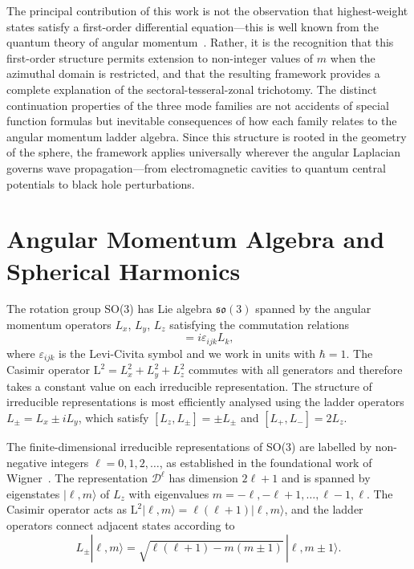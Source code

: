 \documentclass[
  aip,
  amsmath,amssymb,
  preprint
]{revtex4-1}
\begin{document}
The principal contribution of this work is not the observation that highest-weight states satisfy a first-order differential equation---this is well known from the quantum theory of angular momentum~\cite{Sakurai2017}. Rather, it is the recognition that this first-order structure permits extension to non-integer values of $m$ when the azimuthal domain is restricted, and that the resulting framework provides a complete explanation of the sectoral-tesseral-zonal trichotomy. The distinct continuation properties of the three mode families are not accidents of special function formulas but inevitable consequences of how each family relates to the angular momentum ladder algebra. Since this structure is rooted in the geometry of the sphere, the framework applies universally wherever the angular Laplacian governs wave propagation---from electromagnetic cavities to quantum central potentials to black hole perturbations.

\section{Angular Momentum Algebra and Spherical Harmonics}

The rotation group SO(3) has Lie algebra $\mathfrak{so}(3)$ spanned by the angular momentum operators $L_x$, $L_y$, $L_z$ satisfying the commutation relations
\begin{equation}
[L_i, L_j] = i\varepsilon_{ijk} L_k,
\label{eq:commutation}
\end{equation}
where $\varepsilon_{ijk}$ is the Levi-Civita symbol and we work in units with $\hbar = 1$. The Casimir operator $\mathrm{L}^2 = L_x^2 + L_y^2 + L_z^2$ commutes with all generators and therefore takes a constant value on each irreducible representation. The structure of irreducible representations is most efficiently analysed using the ladder operators $L_\pm = L_x \pm i L_y$, which satisfy $[L_z, L_\pm] = \pm L_\pm$ and $[L_+, L_-] = 2L_z$.

The finite-dimensional irreducible representations of SO(3) are labelled by non-negative integers $\ell = 0, 1, 2, \ldots$, as established in the foundational work of Wigner~\cite{Wigner1959}. The representation $\mathcal{D}^\ell$ has dimension $2\ell + 1$ and is spanned by eigenstates $|\ell, m\rangle$ of $L_z$ with eigenvalues $m = -\ell, -\ell+1, \ldots, \ell-1, \ell$. The Casimir operator acts as $\mathrm{L}^2 |\ell, m\rangle = \ell(\ell+1) |\ell, m\rangle$, and the ladder operators connect adjacent states according to
\begin{equation}
L_\pm |\ell, m\rangle = \sqrt{\ell(\ell+1) - m(m\pm 1)} \, |\ell, m\pm 1\rangle.
\label{eq:ladder_action}
\end{equation}
\end{document}
